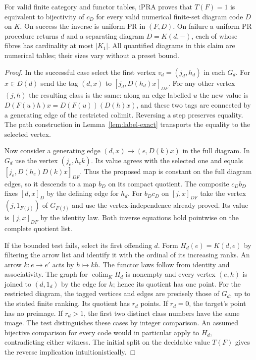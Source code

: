 \begin{theorem}
\label{thm:finite-finality}
For valid finite category and functor tables, iPRA proves that $T(F)=1$ is equivalent to bijectivity of $c_D$ for every valid numerical finite-set diagram code $D$ on $K$. On success the inverse is uniform PR in $(F,D)$. On failure a uniform PR procedure returns $d$ and a separating diagram $D=K(d,-)$, each of whose fibres has cardinality at most $|K_1|$. All quantified diagrams in this claim are numerical tables; their sizes vary without a preset bound.
\end{theorem}
\begin{proof}
In the successful case select the first vertex $v_d=(j_d,h_d)$ in each $G_d$. For $x\in D(d)$ send the tag $(d,x)$ to $[j_d,D(h_d)x]_{DF}$. For any other vertex $(j,h)$ the resulting class is the same: along an edge labelled $u$ the new value is $D(F(u)h)x=D(F(u))(D(h)x)$, and these two tags are connected by a generating edge of the restricted colimit. Reversing a step preserves equality. The path construction in Lemma~\ref{lem:label-exact} transports the equality to the selected vertex.

Now consider a generating edge $(d,x)\to(e,D(k)x)$ in the full diagram. In $G_d$ use the vertex $(j_e,h_e k)$. Its value agrees with the selected one and equals $[j_e,D(h_e)D(k)x]_{DF}$. Thus the proposed map is constant on the full diagram edges, so it descends to a map $b_D$ on its compact quotient. The composite $c_Db_D$ fixes $[d,x]_D$ by the defining edge for $h_d$. For $b_Dc_D$ on $[j,x]_{DF}$ take the vertex $(j,1_{F(j)})$ of $G_{F(j)}$ and use the vertex-independence already proved. Its value is $[j,x]_{DF}$ by the identity law. Both inverse equations hold pointwise on the complete quotient list.

If the bounded test fails, select its first offending $d$. Form $H_d(e)=K(d,e)$ by filtering the arrow list and identify it with the ordinal of its increasing ranks. An arrow $k:e\to e'$ acts by $h\mapsto kh$. The functor laws follow from identity and associativity. The graph for $\operatorname{colim}_K H_d$ is nonempty and every vertex $(e,h)$ is joined to $(d,1_d)$ by the edge for $h$; hence its quotient has one point. For the restricted diagram, the tagged vertices and edges are precisely those of $G_d$, up to the stated finite ranking. Its quotient has $r_d$ points. If $r_d=0$, the target's point has no preimage. If $r_d>1$, the first two distinct class numbers have the same image. The test distinguishes these cases by integer comparison. An assumed bijective comparison for every code would in particular apply to $H_d$, contradicting either witness. The initial split on the decidable value $T(F)$ gives the reverse implication intuitionistically.
\end{proof}

